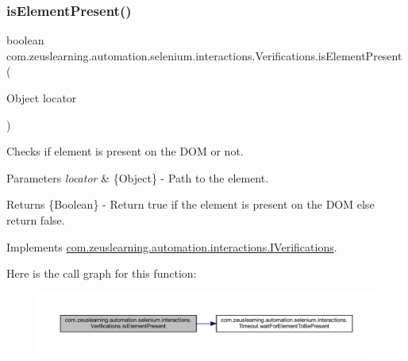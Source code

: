\subsubsection{\texorpdfstring{is\+Element\+Present()}{isElementPresent()}\hspace{0.1cm}{\footnotesize\ttfamily [1/2]}}
{\footnotesize\ttfamily boolean com.\+zeuslearning.\+automation.\+selenium.\+interactions.\+Verifications.\+is\+Element\+Present (\begin{DoxyParamCaption}\item[{Object}]{locator }\end{DoxyParamCaption})\hspace{0.3cm}{\ttfamily [inline]}}

Checks if element is present on the D\+OM or not.


\begin{DoxyParams}{Parameters}
{\em locator} & \{Object\} -\/ Path to the element. \\
\hline
\end{DoxyParams}
\begin{DoxyReturn}{Returns}
\{Boolean\} -\/ Return {\ttfamily true} if the element is present on the D\+OM else return false. 
\end{DoxyReturn}


Implements \hyperlink{interfacecom_1_1zeuslearning_1_1automation_1_1interactions_1_1IVerifications_abc5aef72ba806e5033b1c815799dfd80}{com.\+zeuslearning.\+automation.\+interactions.\+I\+Verifications}.

Here is the call graph for this function\+:
\nopagebreak
\begin{figure}[H]
\begin{center}
\leavevmode
\includegraphics[width=350pt]{d2/d6b/classcom_1_1zeuslearning_1_1automation_1_1selenium_1_1interactions_1_1Verifications_a0624db14fc06201e55890b160331bde9_cgraph}
\end{center}
\end{figure}
\hypertarget{classcom_1_1zeuslearning_1_1automation_1_1selenium_1_1interactions_1_1Verifications_ace7cafb4b24bcba420f997a1bcc9ac6c}{}\label{classcom_1_1zeuslearning_1_1automation_1_1selenium_1_1interactions_1_1Verifications_ace7cafb4b24bcba420f997a1bcc9ac6c} 
